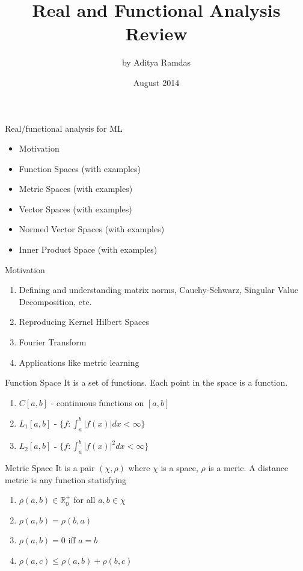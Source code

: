 \documentclass{beamer}
\title{Real and Functional Analysis Review}
\author{by Aditya Ramdas}
\date{August 2014}
\begin{document}
\maketitle

\begin{frame}{Real/functional analysis for ML}
\begin{itemize}
\item Motivation
\item Function Spaces (with examples)
\item Metric Spaces (with examples)
\item Vector Spaces (with examples)
\item Normed Vector Spaces (with examples)
\item Inner Product Space (with examples)
\end{itemize}
\end{frame}

\begin{frame}{Motivation}
\begin{enumerate}
\item Defining and understanding matrix norms, Cauchy-Schwarz, Singular Value Decomposition, etc.
\item Reproducing Kernel Hilbert Spaces
\item Fourier Transform
\item Applications like metric learning
\end{enumerate}
\end{frame}

\begin{frame}{Function Space}
It is a set of functions. Each point in the space is a function.
\begin{enumerate}
\item $C[a, b]$ - continuous  functions on $[a, b]$
\item $L_1[a,b]$ - $\{f: \int_a^b |f(x)| dx < \infty\}$
\item $L_2[a,b]$ - $\{f: \int_a^b |f(x)|^2 dx < \infty\}$
\end{enumerate}
\end{frame}

\begin{frame}{Metric Space}
It is a pair $(\chi,\rho)$ where $\chi$ is a space, $\rho$ is a meric. A distance metric is any function statisfying
\begin{enumerate}
\item $\rho(a,b)\in\mathbb{R}_0^+$ for all $a,b\in\chi$
\item $\rho(a,b)=\rho(b,a)$
\item $\rho(a,b)=0$ iff $a=b$
\item $\rho(a,c)\le \rho(a,b)+\rho(b,c)$
\end{enumerate}
\end{frame}
\end{document}
